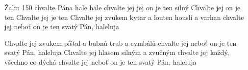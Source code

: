 \begin{TEXT}{Žalm 150}
\REFREN   {} chvalte Pána \NL
hale   \NL
hale chvalte   \NL
{} jej   
\SLOKA {} jej  on je ten silný \NL
Chvalte jej  on je ten  \NL
Chvalte jej   je ten    
\SLOKA Chvalte jej zvukem kytar a louten \NL
houslí a varhan \NL
chvalte jej neboť on je ten svatý Pán, haleluja 

\SLOKA Chvalte jej zvukem píšťal a bubnů \NL
trub a cymbálů \NL
chvalte jej neboť on je ten svatý Pán, haleluja 
\SLOKA Chvalte jej hlasem silným a zvučným \NL
chvalte jej každý, všechno co dýchá \NL
chvalte jej neboť on je ten svatý Pán, haleluja \NL
\end{TEXT}
